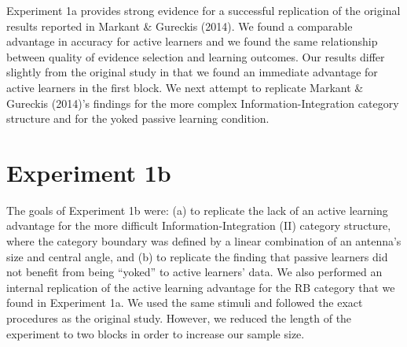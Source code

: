 \documentclass[10pt, letterpaper]{article}
\begin{document}
Experiment 1a provides strong evidence for a successful replication of
the original results reported in Markant \& Gureckis (2014). We found a
comparable advantage in accuracy for active learners and we found the
same relationship between quality of evidence selection and learning
outcomes. Our results differ slightly from the original study in that we
found an immediate advantage for active learners in the first block. We
next attempt to replicate Markant \& Gureckis (2014)'s findings for the
more complex Information-Integration category structure and for the
yoked passive learning condition.

\section{Experiment 1b}\label{experiment-1b}

The goals of Experiment 1b were: (a) to replicate the lack of an active
learning advantage for the more difficult Information-Integration (II)
category structure, where the category boundary was defined by a linear
combination of an antenna's size and central angle, and (b) to replicate
the finding that passive learners did not benefit from being ``yoked''
to active learners' data. We also performed an internal replication of
the active learning advantage for the RB category that we found in
Experiment 1a. We used the same stimuli and followed the exact
procedures as the original study. However, we reduced the length of the
experiment to two blocks in order to increase our sample size.
\end{document}
